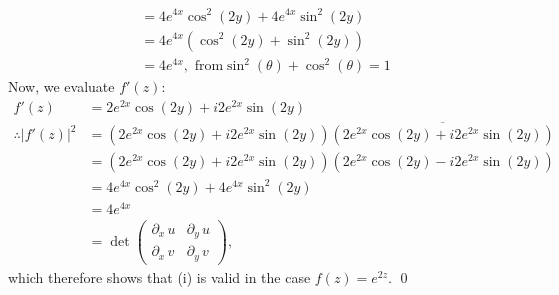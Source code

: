 \documentclass[a4paper, titlepage, DIV=14]{scrartcl}
\begin{document}
\begin{enumerate}[(i)]
\begin{align*}
            &= 4e^{4x}\cos^{2}(2y) + 4e^{4x}\sin^{2}(2y) \\
            &= 4e^{4x}(\cos^{2}(2y) + \sin^{2}(2y)) \\
            &= 4e^{4x}, \text{ from} \sin^{2}(\theta) + \cos^{2}(\theta) = 1
        \end{align*}
        Now, we evaluate $f'(z)$:
        \begin{align*}
            f'(z) &= 2e^{2x}\cos(2y) + i2e^{2x}\sin(2y) \\
            \therefore |f'(z)|^{2} &= (2e^{2x}\cos(2y) + 
                i2e^{2x}\sin(2y))\overline{(2e^{2x}\cos(2y) + i2e^{2x}\sin(2y))} \\
                &= (2e^{2x}\cos(2y) + i2e^{2x}\sin(2y))(2e^{2x}\cos(2y) - i2e^{2x}\sin(2y)) \\
                &= 4e^{4x}\cos^{2}(2y) + 4e^{4x}\sin^{2}(2y) \\
                &= 4e^{4x} \\
                &= \det 
                \begin{pmatrix}
                    \partial_{x} \, u & \partial_{y} \, u \\
                    \partial_{x} \, v & \partial_{y} \, v                
                \end{pmatrix}, 
        \end{align*} which therefore shows that (i) is valid in the case $f(z) = e^{2z}$. \qed \\


\end{enumerate}
\end{document}
